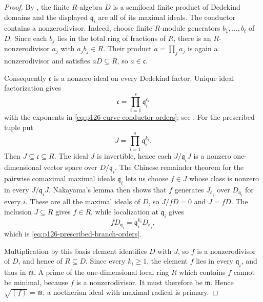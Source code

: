 \begin{proof}
By , the finite \(R\)-algebra
\(D\) is a semilocal finite product of Dedekind domains and the displayed
\(\mathfrak q_i\) are all of its maximal ideals.  The conductor contains a
nonzerodivisor.  Indeed, choose finite \(R\)-module generators
\(b_1,\ldots,b_t\) of \(D\).  Since each \(b_j\) lies in the total ring of
fractions of \(R\), there is an \(R\)-nonzerodivisor \(a_j\) with
\(a_jb_j\in R\).  Their product \(a=\prod_ja_j\) is again a
nonzerodivisor and satisfies \(aD\subseteq R\), so \(a\in\mathfrak c\).

Consequently \(\mathfrak c\) is a nonzero ideal on every Dedekind factor.
Unique ideal factorization gives
\[
                         \mathfrak c
                    =\prod_{i=1}^s\mathfrak q_i^{c_i}
\]
with the exponents in \eqref{eq:p126-curve-conductor-orders}; see
\cite[Tags~034W and~034X]{StacksProject}.  For the prescribed tuple put
\[
                              J=\prod_{i=1}^s\mathfrak q_i^{k_i}.
\]
Then \(J\subseteq\mathfrak c\subseteq R\).  The ideal \(J\) is invertible,
hence each \(J/\mathfrak q_iJ\) is a nonzero one-dimensional vector space
over \(D/\mathfrak q_i\).  The Chinese remainder theorem for the pairwise
comaximal maximal ideals \(\mathfrak q_i\) lets us choose \(f\in J\) whose
class is nonzero in every \(J/\mathfrak q_iJ\).  Nakayama's lemma then shows
that \(f\) generates \(J_{\mathfrak q_i}\) over \(D_{\mathfrak q_i}\) for
every \(i\).  These are all the maximal ideals of \(D\), so \(J/fD=0\) and
\(J=fD\).  The inclusion \(J\subseteq R\) gives \(f\in R\), while
localization at \(\mathfrak q_i\) gives
\[
                         fD_{\mathfrak q_i}
                    =\mathfrak q_i^{k_i}D_{\mathfrak q_i},
\]
which is \eqref{eq:p126-prescribed-branch-orders}.

Multiplication by this basis element identifies \(D\) with \(J\), so \(f\)
is a nonzerodivisor of \(D\), and hence of \(R\subseteq D\).  Since every
\(k_i\geq1\), the element \(f\) lies in every \(\mathfrak q_i\), and thus
in \(\mathfrak m\).  A prime of the one-dimensional local ring \(R\)
which contains \(f\) cannot be minimal, because \(f\) is a
nonzerodivisor.  It must therefore be \(\mathfrak m\).  Hence
\(\sqrt{(f)}=\mathfrak m\); a noetherian ideal with maximal radical is
primary.
\end{proof}

